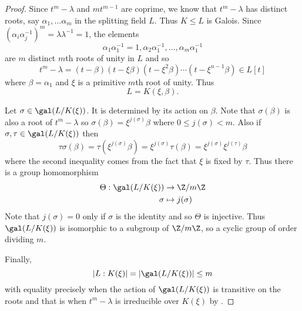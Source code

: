 \documentclass[a4paper]{article}
\begin{document}
\begin{proof}
  Since \(t^m - \lambda\) and \(mt^{m - 1}\) are coprime, we know that \(t^m - \lambda\) has distinct roots, say \(\alpha_1, \dots \alpha_m\) in the splitting field \(L\). Thus \(K \leq L\) is Galois. Since \((\alpha_i\alpha_j^{-1})^m = \lambda \lambda^{-1} = 1\), the elements
  \[
    \alpha_1\alpha_1^{-1} = 1, \alpha_2\alpha_1^{-1}, \dots, \alpha_m\alpha_1^{-1}
  \]
  are \(m\) distinct \(m\)th roots of unity in \(L\) and so
  \[
    t^m - \lambda = (t - \beta)(t - \xi\beta)(t - \xi^2\beta) \cdots (t - \xi^{n - 1}\beta) \in L[t]
  \]
  where \(\beta = \alpha_1\) and \(\xi\) is a primitive \(m\)th root of unity. Thus
  \[
    L = K(\xi, \beta).
  \]

  Let \(\sigma \in \gal(L/K(\xi))\). It is determined by its action on \(\beta\). Note that \(\sigma(\beta)\) is also a root of \(t^m - \lambda\) so \(\sigma(\beta) = \xi^{j(\sigma)}\beta\) where \(0 \leq j(\sigma) < m\). Also if \(\sigma, \tau \in \gal(L/K(\xi))\) then
  \[
    \tau\sigma(\beta) = \tau(\xi^{j(\sigma)}\beta) = \xi^{j(\sigma)}\tau(\beta) = \xi^{j(\sigma)}\xi^{j(\tau)}\beta
  \]
  where the second inequality comes from the fact that \(\xi\) is fixed by \(\tau\). Thus there is a group homomorphism
  \begin{align*}
    \Theta: \gal(L/K(\xi)) &\to \Z/m\Z \\
    \sigma &\mapsto j(\sigma)
  \end{align*}
  Note that \(j(\sigma) = 0\) only if \(\sigma\) is the identity and so \(\Theta\) is injective. Thus \(\gal(L/K(\xi))\) is isomorphic to a subgroup of \(\Z/m\Z\), so a cyclic group of order dividing \(m\).

  Finally,
  \[
    |L:K(\xi)| = |\gal(L/K(\xi))| \leq m
  \]
  with equality precisely when the action of \(\gal(L/K(\xi))\) is transitive on the roots and that is when \(t^m - \lambda\) is irreducible over \(K(\xi)\) by .
\end{proof}
\end{document}
